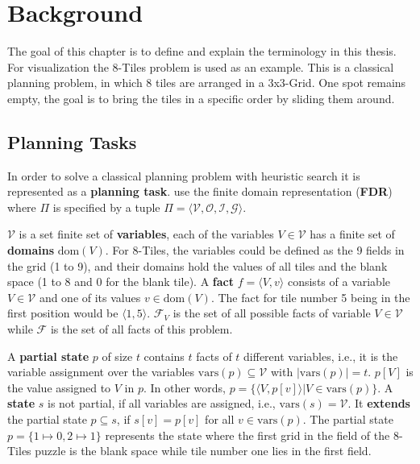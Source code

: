 
\chapter{Background}\label{ch:background}

The goal of this chapter is to define and explain the terminology in this thesis.
For visualization the 8-Tiles problem is used as an example.
This is a classical planning problem, in which 8 tiles are arranged in a 3x3-Grid.
One spot remains empty, the goal is to bring the tiles in a specific order by sliding them around.

\section {Planning Tasks}\label{sec:planning-tasks}
In order to solve a classical planning problem with heuristic search it is represented as a \textbf{planning task}.
\citeauthor{fivser2020strengthening} use the finite domain representation (\textbf{FDR}) where $\Pi$ is specified by a tuple $ \Pi = \langle \mathcal{V}, \mathcal{O}, \mathcal{I}, \mathcal{G} \rangle$.

$\mathcal{V}$ is a set finite set of \textbf{variables}, each of the variables $V\in\mathcal{V}$ has a finite set of \textbf{domains} $\text{dom}(V)$.
For 8-Tiles, the variables could be defined as the 9 fields in the grid (1 to 9), and their domains hold the values of all tiles and the blank space (1 to 8 and 0 for the blank tile).
A \textbf{fact} $f=\langle V, v\rangle$ consists of a variable $V\in\mathcal{V}$ and one of its values $v\in\text{dom}(V)$.
The fact for tile number 5 being in the first position would be $\langle 1,5\rangle$.
$\mathcal{F}_V$ is the set of all possible facts of variable $V\in\mathcal{V}$ while $\mathcal{F}$ is the set of all facts of this problem.

A \textbf{partial state} $p$ of size $t$ contains $t$ facts of $t$ different variables, i.e., it is the variable assignment over the variables $\text{vars}(p)\subseteq\mathcal{V}$ with $|\text{vars}(p)|=t$.
$p[V]$ is the value assigned to $V$ in $p$.
In other words, $p=\{\langle V, p[v] \rangle | V\in\text{vars}(p)\}$.
A \textbf{state} $s$ is not partial, if all variables are assigned, i.e., $\text{vars}(s)=\mathcal{V}$.
It \textbf{extends} the partial state $p\subseteq s$, if $s[v] = p[v]$ for all $v \in\text{vars}(p)$.
The partial state $p = \{1\mapsto0, 2\mapsto1\}$ represents the state where the first grid in the field of the 8-Tiles puzzle is the blank space while tile number one lies in the first field.

